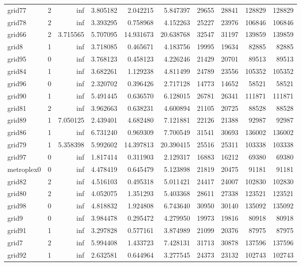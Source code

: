 \begin{longtable}{|l|r|r|r|r|r|r|r|r|r|}
grid77 & 2 & inf & 3.805182 & 2.042215 & 5.847397 & 29655 & 28841 & 128829 & 128829 \\
grid78 & 2 & inf & 3.393295 & 0.758968 & 4.152263 & 25227 & 23976 & 106846 & 106846 \\
grid66 & 2 & 3.715565 & 5.707095 & 14.931673 & 20.638768 & 32547 & 31197 & 139859 & 139859 \\
grid8 & 1 & inf & 3.718085 & 0.465671 & 4.183756 & 19995 & 19634 & 82885 & 82885 \\
grid95 & 0 & inf & 3.768123 & 0.458123 & 4.226246 & 21429 & 20701 & 89513 & 89513 \\
grid84 & 1 & inf & 3.682261 & 1.129238 & 4.811499 & 24789 & 23556 & 105352 & 105352 \\
grid96 & 0 & inf & 2.320702 & 0.396426 & 2.717128 & 14773 & 14652 & 58521 & 58521 \\
grid90 & 1 & inf & 5.491445 & 0.636570 & 6.128015 & 26781 & 26341 & 111871 & 111871 \\
grid81 & 2 & inf & 3.962663 & 0.638231 & 4.600894 & 21105 & 20725 & 88528 & 88528 \\
grid89 & 1 & 7.050125 & 2.439401 & 4.682480 & 7.121881 & 22126 & 21388 & 92987 & 92987 \\
grid86 & 1 & inf & 6.731240 & 0.969309 & 7.700549 & 31541 & 30693 & 136002 & 136002 \\
grid79 & 1 & 5.358398 & 5.992602 & 14.397813 & 20.390415 & 25516 & 25311 & 103338 & 103338 \\
grid97 & 0 & inf & 1.817414 & 0.311903 & 2.129317 & 16883 & 16212 & 69380 & 69380 \\
metroplex0 & 0 & inf & 4.478419 & 0.645479 & 5.123898 & 21819 & 20475 & 91181 & 91181 \\
grid82 & 2 & inf & 4.516103 & 0.495318 & 5.011421 & 24417 & 24007 & 102830 & 102830 \\
grid80 & 2 & inf & 4.052075 & 1.351293 & 5.403368 & 28611 & 27338 & 123521 & 123521 \\
grid98 & 0 & inf & 4.818832 & 1.924808 & 6.743640 & 30950 & 30140 & 135092 & 135092 \\
grid9 & 0 & inf & 3.984478 & 0.295472 & 4.279950 & 19973 & 19816 & 80918 & 80918 \\
grid91 & 1 & inf & 3.297828 & 0.577161 & 3.874989 & 21099 & 20376 & 87975 & 87975 \\
grid7 & 2 & inf & 5.994408 & 1.433723 & 7.428131 & 31713 & 30878 & 137596 & 137596 \\
grid92 & 1 & inf & 2.632581 & 0.644964 & 3.277545 & 24373 & 23132 & 102743 & 102743 \\

\end{longtable}
